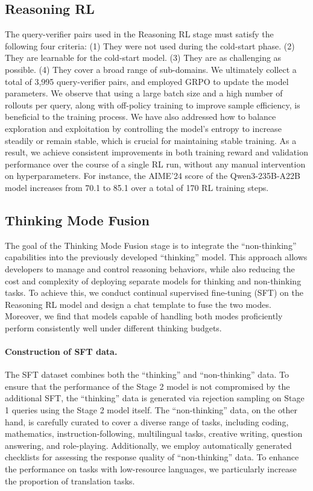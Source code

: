 \subsection{Reasoning RL}


The query-verifier pairs used in the Reasoning RL stage must satisfy the following four criteria:
(1) They were not used during the cold-start phase.
(2) They are learnable for the cold-start model.
(3) They are as challenging as possible.
(4) They cover a broad range of sub-domains.
We ultimately collect a total of 3,995 query-verifier pairs, and employed GRPO \citep{deepseekmath} to update the model parameters.
We observe that using a large batch size and a high number of rollouts per query, along with off-policy training to improve sample efficiency, is beneficial to the training process.
We have also addressed how to balance exploration and exploitation by controlling the model’s entropy to increase steadily or remain stable, which is crucial for maintaining stable training.
As a result, we achieve consistent improvements in both training reward and validation performance over the course of a single RL run, without any manual intervention on hyperparameters. For instance, the AIME'24 score of the Qwen3-235B-A22B model increases from 70.1 to 85.1 over a total of 170 RL training steps.





\subsection{Thinking Mode Fusion}

The goal of the Thinking Mode Fusion stage is to integrate the ``non-thinking'' capabilities into the previously developed ``thinking'' model. 
This approach allows developers to manage and control reasoning behaviors, while also reducing the cost and complexity of deploying separate models for thinking and non-thinking tasks.
To achieve this, we conduct continual supervised fine-tuning (SFT) on the Reasoning RL model and design a chat template to fuse the two modes. 
Moreover, we find that models capable of handling both modes proficiently perform consistently well under different thinking budgets.

\paragraph{Construction of SFT data.} The SFT dataset combines both the ``thinking'' and ``non-thinking'' data. 
To ensure that the performance of the Stage 2 model is not compromised by the additional SFT, the ``thinking'' data is generated via rejection sampling on Stage 1 queries using the Stage 2 model itself. 
The ``non-thinking'' data, on the other hand, is carefully curated to cover a diverse range of tasks, including coding, mathematics, instruction-following, multilingual tasks, creative writing, question answering, and role-playing.
Additionally, we employ automatically generated checklists for assessing the response quality of ``non-thinking'' data. To enhance the performance on tasks with low-resource languages, we particularly increase the proportion of translation tasks.

